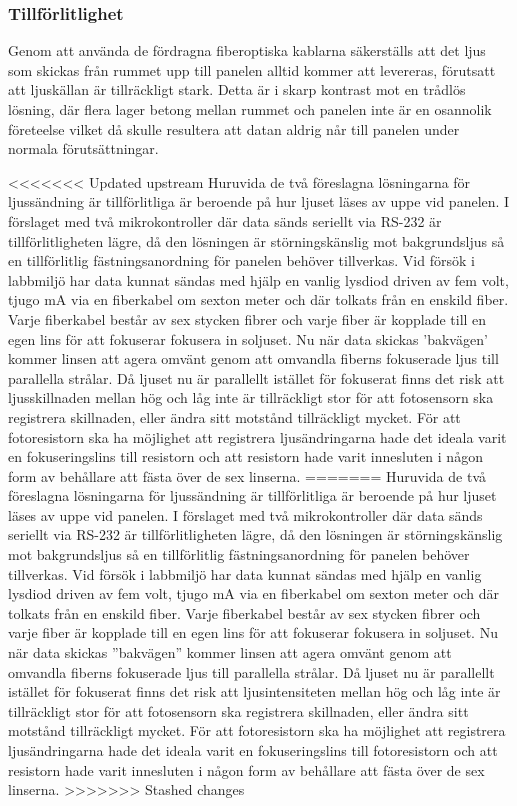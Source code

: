         \subsubsection{Tillförlitlighet} %
        \label{sub:tillf_rlitlighet}
            Genom att använda de fördragna fiberoptiska kablarna säkerställs att det ljus som skickas från rummet upp till panelen alltid kommer att levereras, förutsatt att ljuskällan är tillräckligt stark. Detta är i skarp kontrast mot en trådlös lösning, där flera lager betong mellan rummet och panelen inte är en osannolik företeelse vilket då skulle resultera att datan aldrig når till panelen under normala förutsättningar. \bigskip

<<<<<<< Updated upstream
            Huruvida de två föreslagna lösningarna för ljussändning är tillförlitliga är beroende på hur ljuset läses av uppe vid panelen. I förslaget med två mikrokontroller där data sänds seriellt via RS-232 är tillförlitligheten lägre, då den lösningen är störningskänslig mot bakgrundsljus så en tillförlitlig fästningsanordning för panelen behöver tillverkas. Vid försök i labbmiljö har data kunnat sändas med hjälp en vanlig lysdiod driven av fem volt, tjugo mA via en fiberkabel om sexton meter och där tolkats från en enskild fiber. Varje fiberkabel består av sex stycken fibrer och varje fiber är kopplade till en egen lins för att fokuserar fokusera in soljuset. Nu när data skickas 'bakvägen' kommer linsen att agera omvänt genom att omvandla fiberns fokuserade ljus till parallella strålar. Då ljuset nu är parallellt istället för fokuserat finns det risk att ljusskillnaden mellan hög och låg inte är tillräckligt stor för att fotosensorn ska registrera skillnaden, eller ändra sitt motstånd tillräckligt mycket. För att fotoresistorn ska ha möjlighet att registrera ljusändringarna hade det ideala varit en fokuseringslins till resistorn och att resistorn hade varit innesluten i någon form av behållare att fästa över de sex linserna. \bigskip
=======
            Huruvida de två föreslagna lösningarna för ljussändning är tillförlitliga är beroende på hur ljuset läses av uppe vid panelen. I förslaget med två mikrokontroller där data sänds seriellt via RS-232 är tillförlitligheten lägre, då den lösningen är störningskänslig mot bakgrundsljus så en tillförlitlig fästningsanordning för panelen behöver tillverkas. Vid försök i labbmiljö har data kunnat sändas med hjälp en vanlig lysdiod driven av fem volt, tjugo mA via en fiberkabel om sexton meter och där tolkats från en enskild fiber. Varje fiberkabel består av sex stycken fibrer och varje fiber är kopplade till en egen lins för att fokuserar fokusera in soljuset. Nu när data skickas ''bakvägen'' kommer linsen att agera omvänt genom att omvandla fiberns fokuserade ljus till parallella strålar. Då ljuset nu är parallellt istället för fokuserat finns det risk att ljusintensiteten mellan hög och låg inte är tillräckligt stor för att fotosensorn ska registrera skillnaden, eller ändra sitt motstånd tillräckligt mycket. För att fotoresistorn ska ha möjlighet att registrera ljusändringarna hade det ideala varit en fokuseringslins till fotoresistorn och att resistorn hade varit innesluten i någon form av behållare att fästa över de sex linserna. \bigskip
>>>>>>> Stashed changes

